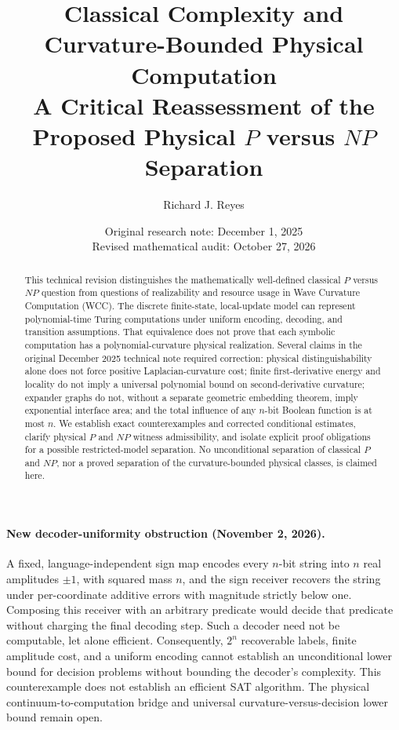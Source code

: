 \documentclass[11pt,a4paper]{article}
\title{\textbf{Classical Complexity and Curvature-Bounded Physical Computation}\\[4pt]
\large A Critical Reassessment of the Proposed Physical $P$ versus $NP$ Separation}
\author{Richard J. Reyes}
\date{Original research note: December 1, 2025\\Revised mathematical audit: October 27, 2026}
\begin{document}
\maketitle
\begin{abstract}
This technical revision distinguishes the mathematically well-defined classical
$P$ versus $NP$ question from questions of realizability and resource usage
in Wave Curvature Computation (WCC). The discrete finite-state, local-update
model can represent polynomial-time Turing computations under uniform encoding,
decoding, and transition assumptions. That equivalence does not prove that each
symbolic computation has a polynomial-curvature physical realization.
Several claims in the original December 2025 technical note required correction:
physical distinguishability alone does not force positive Laplacian-curvature
cost; finite first-derivative energy and locality do not imply a universal
polynomial bound on second-derivative curvature; expander graphs do not, without
a separate geometric embedding theorem, imply exponential interface area; and
the total influence of any $n$-bit Boolean function is at most $n$.
We establish exact counterexamples and corrected conditional estimates,
clarify physical $P$ and $NP$ witness admissibility, and isolate explicit proof
obligations for a possible restricted-model separation. No unconditional
separation of classical $P$ and $NP$, nor a proved separation of the
curvature-bounded physical classes, is claimed here.
\end{abstract}
\paragraph{New decoder-uniformity obstruction (November 2, 2026).}
A fixed, language-independent sign map encodes every $n$-bit string into
$n$ real amplitudes $\pm1$, with squared mass $n$, and the sign receiver
recovers the string under per-coordinate additive errors with magnitude
strictly below one. Composing this receiver with an arbitrary predicate
would decide that predicate without charging the final decoding step.
Such a decoder need not be computable, let alone efficient.
Consequently, $2^n$ recoverable labels, finite amplitude cost,
and a uniform encoding cannot establish an unconditional lower bound
for decision problems without bounding the decoder's complexity.
This counterexample does not establish an efficient SAT algorithm.
The physical continuum-to-computation bridge and universal
curvature-versus-decision lower bound remain open.
\end{document}
